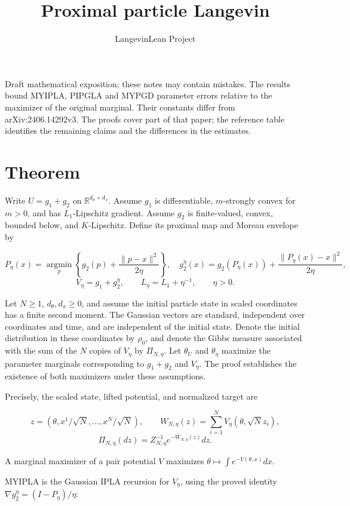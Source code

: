 \documentclass[11pt,a4paper]{article}
\title{\texorpdfstring{Proximal particle Langevin}{Proximal particle Langevin}}
\author{LangevinLean Project}
\date{}
\begin{document}
\maketitle
Draft mathematical exposition; these notes may contain mistakes.
The results bound MYIPLA, PIPGLA and MYPGD parameter errors relative to the maximizer of the original marginal. Their constants differ from arXiv:2406.14292v3. The proofs cover part of that paper; the reference table identifies the remaining claims and the differences in the estimates.
\section{\texorpdfstring{Theorem}{Theorem}}


Write \(U=g_1+g_2\) on \(\mathbb R^{d_\theta+d_x}\). Assume \(g_1\) is differentiable, \(m\)-strongly convex for \(m>0\), and has \(L_1\)-Lipschitz gradient. Assume \(g_2\) is finite-valued, convex, bounded below, and \(K\)-Lipschitz. Define its proximal map and Moreau envelope by


\[P_\eta(x)=\operatorname*{argmin}_p\left\{g_2(p)+\frac{\|p-x\|^2}{2\eta}\right\},\quad
g_2^\eta(x)=g_2(P_\eta(x))+\frac{\|P_\eta(x)-x\|^2}{2\eta},\]
\[V_\eta=g_1+g_2^\eta,\qquad L_\eta=L_1+\eta^{-1},\qquad\eta>0.\]


Let \(N\ge1\), \(d_\theta,d_x\ge0\), and assume the initial particle state in scaled coordinates has a finite second moment. The Gaussian vectors are standard, independent over coordinates and time, and are independent of the initial state. Denote the initial distribution in these coordinates by \(\rho_0\), and denote the Gibbs measure associated with the sum of the \(N\) copies of \(V_\eta\) by \(\Pi_{N,\eta}\). Let \(\theta_U\) and \(\theta_\eta\) maximize the parameter marginals corresponding to \(g_1+g_2\) and \(V_\eta\). The proof establishes the existence of both maximizers under these assumptions.



Precisely, the scaled state, lifted potential, and normalized target are


\[z=(\theta,x^1/\sqrt N,\ldots,x^N/\sqrt N),\qquad
W_{N,\eta}(z)=\sum_{i=1}^N V_\eta(\theta,\sqrt N z_i),\]
\[\Pi_{N,\eta}(dz)=Z_{N,\eta}^{-1}e^{-W_{N,\eta}(z)}dz.\]


A marginal maximizer of a pair potential \(V\) maximizes \(\theta\mapsto\int e^{-V(\theta,x)}dx\).



MYIPLA is the Gaussian IPLA recursion for \(V_\eta\), using the proved identity \(\nabla g_2^\eta=(I-P_\eta)/\eta\):
\end{document}
